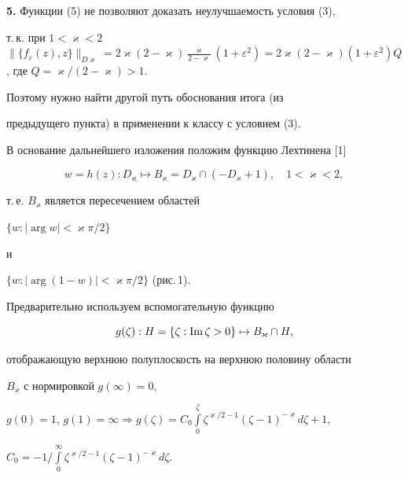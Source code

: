 {\bf 5.} Функции (5) не позволяют доказать неулучшаемость условия (3),


т.\,к. при $1<\varkappa<2$ \ $\|\{f_{\varepsilon} (z),z\} \|_{D\varkappa} 


=2\varkappa ({2-\varkappa} )\frac{{\varkappa}}{{2-\varkappa}}(


{1+\varepsilon^2})=2\varkappa ({2-\varkappa} )(


{1+\varepsilon^2})Q$, где $Q=\varkappa /({2-\varkappa})>1$.


Поэтому нужно найти другой путь обоснования итога (из 


предыдущего пункта) в применении к классу с условием (3).





В основание дальнейшего изложения положим функцию Лехтинена [1]


\begin{equation}


w=h(z):D_{\varkappa} \mapsto B_{\varkappa}=D_{\varkappa} \cap 


({- D_{\varkappa}+1}),\quad 1 < \varkappa < 2,


\end{equation}


т.\,е. $B_{\varkappa}$ является пересечением областей


$\{w:|\arg w|<\varkappa \pi /2\}$


и


$\{w:|\arg({1-w})| < \varkappa \pi /2\} $ (рис.\,1).





Предварительно используем вспомогательную функцию 


$$


g({\zeta} ):H=\{\zeta :\im\zeta > 0\} \mapsto B_{\varkappa} \cap H,


$$


отображающую верхнюю полуплоскость на верхнюю половину области


$B_{\varkappa}$ с нормировкой $g({\infty} )=0$,


$g(0)=1$, $g(1)=\infty \Rightarrow g({\zeta} )=


C_0 \int\limits_0^{\zeta} {\zeta^{\varkappa /2-1}({\zeta-1} 


)^{- \varkappa}} d\zeta+1$,


$C_0 =-1/\int\limits_0^{\infty} 


{\zeta^{\varkappa /2-1}({\zeta-1})^{- \varkappa} d} \zeta $.


